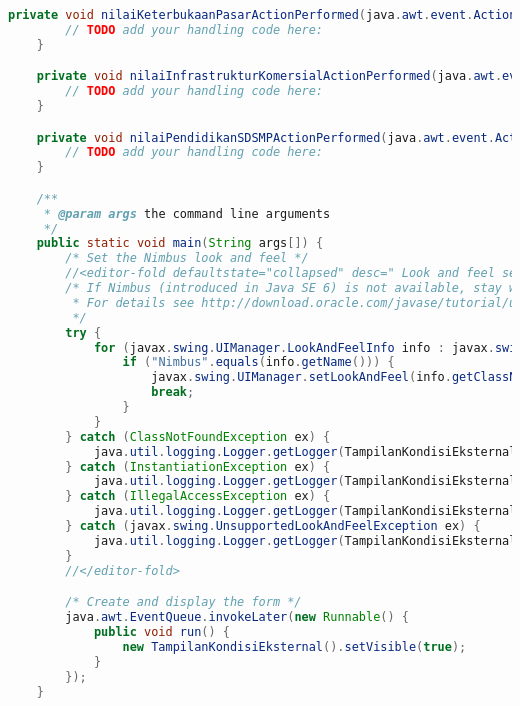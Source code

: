 \begin{lstlisting}[language=Java, caption=TampilanKondisiEksternal.java]
    private void nilaiKeterbukaanPasarActionPerformed(java.awt.event.ActionEvent evt) {                                                      
        // TODO add your handling code here:
    }                                                     

    private void nilaiInfrastrukturKomersialActionPerformed(java.awt.event.ActionEvent evt) {                                                            
        // TODO add your handling code here:
    }                                                           

    private void nilaiPendidikanSDSMPActionPerformed(java.awt.event.ActionEvent evt) {                                                     
        // TODO add your handling code here:
    }                                                    

    /**
     * @param args the command line arguments
     */
    public static void main(String args[]) {
        /* Set the Nimbus look and feel */
        //<editor-fold defaultstate="collapsed" desc=" Look and feel setting code (optional) ">
        /* If Nimbus (introduced in Java SE 6) is not available, stay with the default look and feel.
         * For details see http://download.oracle.com/javase/tutorial/uiswing/lookandfeel/plaf.html 
         */
        try {
            for (javax.swing.UIManager.LookAndFeelInfo info : javax.swing.UIManager.getInstalledLookAndFeels()) {
                if ("Nimbus".equals(info.getName())) {
                    javax.swing.UIManager.setLookAndFeel(info.getClassName());
                    break;
                }
            }
        } catch (ClassNotFoundException ex) {
            java.util.logging.Logger.getLogger(TampilanKondisiEksternal.class.getName()).log(java.util.logging.Level.SEVERE, null, ex);
        } catch (InstantiationException ex) {
            java.util.logging.Logger.getLogger(TampilanKondisiEksternal.class.getName()).log(java.util.logging.Level.SEVERE, null, ex);
        } catch (IllegalAccessException ex) {
            java.util.logging.Logger.getLogger(TampilanKondisiEksternal.class.getName()).log(java.util.logging.Level.SEVERE, null, ex);
        } catch (javax.swing.UnsupportedLookAndFeelException ex) {
            java.util.logging.Logger.getLogger(TampilanKondisiEksternal.class.getName()).log(java.util.logging.Level.SEVERE, null, ex);
        }
        //</editor-fold>

        /* Create and display the form */
        java.awt.EventQueue.invokeLater(new Runnable() {
            public void run() {
                new TampilanKondisiEksternal().setVisible(true);
            }
        });
    }


\end{lstlisting}
